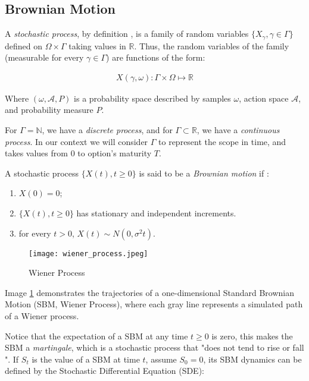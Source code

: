 \subsection{Brownian Motion}

A \textit{stochastic process}, by definition \cite{Iacus2008}, is a family of random variables $\{X_\gamma,\gamma\in\Gamma\}$ defined on $\Omega\times\Gamma$ taking values in $\mathbb{R}$. Thus, the random variables of the family (measurable for every $\gamma\in\Gamma$) are functions of the form:

\begin{align*}
X(\gamma,\omega):\Gamma\times\Omega\mapsto\mathbb{R}
\end{align*}

Where $(\omega,\mathcal{A},P)$ is a probability space described by samples $\omega$, action space $\mathcal{A}$, and probability measure $P$.

For $\Gamma=\mathbb{N}$, we have a \textit{discrete process}, and for $\Gamma\subset\mathbb{R}$, we have a \textit{continuous process}. In our context we will consider $\Gamma$ to represent the scope in time, and takes values from $0$ to option's maturity $T$.

A stochastic process $\{X(t), t\geq 0\}$ is said to be a \textit{Brownian motion} if \cite{Iacus2008}:

\begin{enumerate}
	\item $X(0)=0$;
	\item $\{X(t),t\geq0\}$ has stationary and independent increments.
	\item for every $t>0$, $X(t)\sim N(0,\sigma^2 t)$.
\end{enumerate}

\begin{figure}[H]
	\centering
	\texttt{[image: wiener\_process.jpeg]}
	\caption{Wiener Process} \label{img:wiener_process}
\end{figure}

Image \ref{img:wiener_process} demonstrates the trajectories of a one-dimensional Standard Brownian Motion (SBM, Wiener Process), where each gray line represents a simulated path of a Wiener process.

Notice that the expectation of a SBM at any time $t\geq0$ is zero, this makes the SBM a \textit{martingale}, which is a stochastic process that "does not tend to rise or fall \cite{Shreve2004}". If $S_t$ is the value of a SBM at time $t$, assume $S_0=0$, its SBM dynamics can be defined by the Stochastic Differential Equation (SDE):


